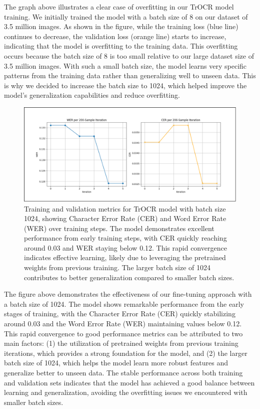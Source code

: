 The graph above illustrates a clear case of overfitting in our TrOCR model training. 
We initially trained the model with a batch size of 8 on our dataset of 3.5 million images. 
As shown in the figure, while the training loss (blue line) continues to decrease, 
the validation loss (orange line) starts to increase, indicating that the model is overfitting 
to the training data. This overfitting occurs because the batch size of 8 is too small relative 
to our large dataset size of 3.5 million images. With such a small batch size, the model learns 
very specific patterns from the training data rather than generalizing well to unseen data. 
This is why we decided to increase the batch size to 1024, which helped improve the model's 
generalization capabilities and reduce overfitting.

\begin{figure}[H]
    \centering
    \includegraphics[width=\textwidth]{figures/trocr_fine_tuning.png}
    \caption{Training and validation metrics for TrOCR model with batch size 1024, 
    showing Character Error Rate (CER) and Word Error Rate (WER) over training steps. 
    The model demonstrates excellent performance from early training steps, with CER quickly 
    reaching around 0.03 and WER staying below 0.12. This rapid convergence indicates effective 
    learning, likely due to leveraging the pretrained weights from previous training. 
    The larger batch size of 1024 contributes to better generalization compared to smaller batch sizes.}
    \label{fig:trocr-fine-tuning}
\end{figure}

The figure above demonstrates the effectiveness of our fine-tuning approach with a batch size of 1024. 
The model shows remarkable performance from the early stages of training, with the Character 
Error Rate (CER) quickly stabilizing around 0.03 and the Word Error Rate (WER) maintaining 
values below 0.12. This rapid convergence to good performance metrics can be attributed to 
two main factors: (1) the utilization of pretrained weights from previous training iterations, 
which provides a strong foundation for the model, and (2) the larger batch size of 1024, which 
helps the model learn more robust features and generalize better to unseen data. The stable 
performance across both training and validation sets indicates that the model has achieved a 
good balance between learning and generalization, avoiding the overfitting issues we 
encountered with smaller batch sizes.


